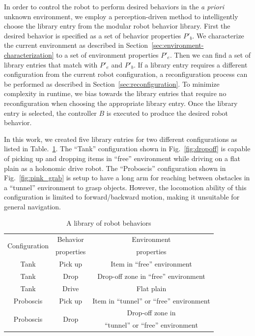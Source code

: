 \documentclass[conference]{IEEEtran}
\begin{document}
In order to control the robot to perform desired behaviors in the \textit{a priori} unknown environment, we employ a perception-driven method to intelligently choose the library entry from the modular robot behavior library.
First the desired behavior is specified as a set of behavior properties $P'_b$.
We characterize the current environment as described in Section~\ref{sec:environment-characterization} to a set of environment properties $P'_e$.
Then we can find a set of library entries that match with $P'_e$ and $P'_b$.
If a library entry requires a different configuration from the current robot configuration, a reconfiguration process can be performed as described in Section~\ref{sec:reconfiguration}.
To minimize complexity in runtime, we bias towards the library entries that require no reconfiguration when choosing the appropriate library entry.
Once the library entry is selected, the controller $B$ is executed to produce the desired robot behavior.

In this work, we created five library entries for two different configurations as listed in Table.~\ref{table:1}. 
The ``Tank'' configuration shown in Fig.~\ref{fig:dropoff} is capable of picking up and dropping items in ``free'' environment while driving on a flat plain as a holonomic drive robot.
The ``Proboscis'' configuration shown in Fig.~\ref{fig:pink_grab} is setup to have a long arm for reaching between obstacles in a ``tunnel'' environment to grasp objects. However, the locomotion ability of this configuration is limited to forward/backward motion, making it unsuitable for general navigation.

\begin{table}
\centering
\begin{tabular}{ |c|c|c| } 
 \hline
 \multirow{2}{6em}{Configuration} & Behavior & Environment \\
 & properties & properties \\
 \hline
 Tank & Pick up & Item in ``free'' environment \\\hline
 Tank & Drop & Drop-off zone in ``free'' environment \\\hline
 Tank & Drive & Flat plain\\ \hline
 Proboscis & Pick up & Item in ``tunnel'' or ``free'' environment \\ \hline
 \multirow{2}{4em}{Proboscis} & \multirow{2}{2em}{Drop} & Drop-off zone in \\
 & & ``tunnel'' or ``free'' environment \\ 
 \hline
\end{tabular}
\caption{A library of robot behaviors}
\label{table:1}
\end{table}
\end{document}

